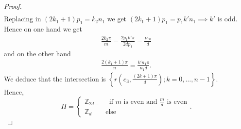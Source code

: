 \documentclass[11pt,a4paper]{amsart}
\theoremstyle{definition}
\newcommand{\ZZ}{\mathbb{Z}}                %
\newcommand{\1}{\mathds{1}}		            %
\newcommand{\set}[1]{\left\{#1\right\}}     %
\begin{document}
\begin{proof}
\begin{align*}
\end{align*}
Replacing in $(2k_1+1)p_1=k_2n_1$ we get $(2k_1+1)p_1=p_1k'n_1 \implies k'$ is odd. Hence on one hand we get
\begin{align*}
\frac{2k_2\pi}{m}=\frac{2p_1k'\pi}{2dp_1}=\frac{k'\pi}{d}
\end{align*}
and on the other hand
\begin{align*}
\frac{2(k_1+1)\pi}{n}=\frac{k'n_1\pi}{n_1d}.
\end{align*}
We deduce that the intersection is $\set{r(e_3,\frac{(2k+1)\pi}{d});k=0,\dotsc,n-1}$.
\\Hence,
\begin{equation*}H=
\begin{cases}
\ZZ_{2d-} \quad \text{ if $m$ is even and $\frac{m}{d}$ is even}\\
\ZZ_d  \qquad \text{else}
\end{cases}.
\end{equation*}
\end{proof}
\end{document}
